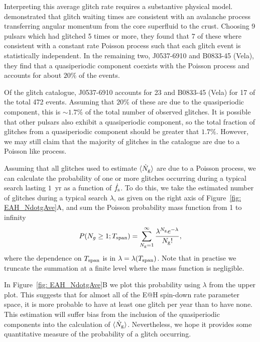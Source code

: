 \documentclass[../full_thesis/full_thesis.tex]{subfiles}
\begin{document}
Interpreting this average glitch rate requires a substantive physical
model. \citet{Melatos2008} demonstrated that glitch waiting times are consistent
with an avalanche process transferring angular momentum from the core superfluid
to the crust. Choosing 9 pulsars which had glitched 5 times or more, they found
that 7 of these where consistent with a constant rate Poisson process such that
each glitch event is statistically independent. In the remaining two, J0537-6910
and B0833-45 (Vela), they find that a quasiperiodic component coexists with the Poisson
process and accounts for about $20\%$ of the events.

Of the glitch catalogue, J0537-6910 accounts for 23 and B0833-45 (Vela) for 17 of
the total 472 events. Assuming that $20\%$ of these are due to the
quasiperiodic component, this is $\sim 1.7\%$ of the total number of observed glitches. It
is possible that other pulsars also exhibit a quasiperiodic component, so the
total fraction of glitches from a quasiperiodic component should be greater
that $1.7\%$. However, we may still claim that the majority of glitches in the
catalogue are due to a Poisson like process.

Assuming that all glitches used to estimate $\langle \dot{N}_{\textrm{g}}\rangle$ are due to a Poisson
process, we can calculate the probability of one or more glitches occurring during
a typical search lasting $1$~yr as a function of $\dot{f}_{\textrm{s}}$. To do this, we take the
estimated number of glitches during a typical search
$\lambda$, as given on the right axis of Figure~\ref{fig: EAH_NdotgAve}A,
and sum the Poisson probability mass function from 1 to infinity
\begin{align}
P(N_{g} \ge 1; T_{\mathrm{span}}) = \sum_{N_{\textrm{g}}=1}^{\infty}\frac{\lambda^{N_{\textrm{g}}}e^{-\lambda}}{N_{\textrm{g}}!},
\label{eqn: p one glitch or more}
\end{align}
where the dependence on $T_{\mathrm{span}}$ is in $\lambda=\lambda(T_{\mathrm{span}})$.
Note that in practise we truncate the summation at a finite level where the
mass function is negligible.

In Figure~\ref{fig: EAH_NdotgAve}B we plot this probability using $\lambda$
from the upper plot. This suggests that for almost all of the E@H spin-down
rate parameter space, it is more probable to have at least one glitch per year
than to have none. This estimation will suffer bias from the inclusion of the
quasiperiodic components into the calculation of $\langle \dot{N}_{\textrm{g}}\rangle$. Nevertheless, we
hope it provides some quantitative measure of the probability of a glitch
occurring.
\end{document}
